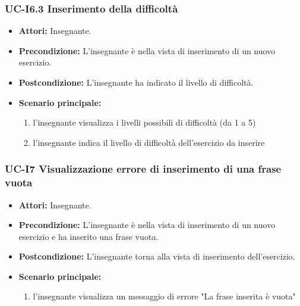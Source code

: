 \subsubsection{UC-I6.3 Inserimento della difficoltà}
\begin{itemize}
	\item \textbf{Attori: }Insegnante.
	\item \textbf{Precondizione:} L'insegnante è nella vista di inserimento di un nuovo esercizio.
	\item \textbf{Postcondizione:} L'insegnante ha indicato il livello di difficoltà.
	\item \textbf{Scenario principale:}
	\begin{enumerate}
		\item l'insegnante visualizza i livelli possibili di difficoltà (da 1 a 5)
		\item l'insegnante indica il livello di difficoltà dell'esercizio da inserire
	\end{enumerate}
\end{itemize}

\subsubsection{UC-I7 Visualizzazione errore di inserimento di una frase vuota}
\begin{itemize}
	\item \textbf{Attori:} Insegnante.
	\item \textbf{Precondizione:} L'insegnante è nella vista di inserimento di un nuovo esercizio e ha inserito una frase vuota.
	\item \textbf{Postcondizione:} L'insegnante torna alla vista di inserimento dell'esercizio.
	\item \textbf{Scenario principale:}
	\begin{enumerate}
		\item l'insegnante visualizza un messaggio di errore "La frase inserita è vuota"
	\end{enumerate}
\end{itemize}

